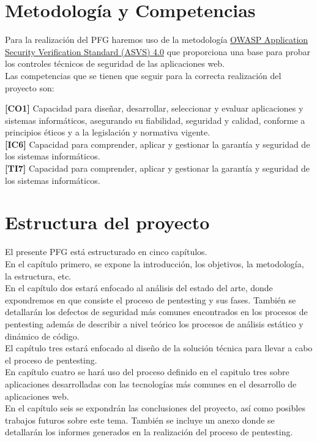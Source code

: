 \section{Metodología y Competencias}

Para la realización del PFG haremos uso de la 
metodología \href{https://owasp.org/www-pdf-archive/OWASP_Application_Security_Verification_Standard_4.0-en.pdf}{OWASP Application Security Verification Standard (ASVS) 4.0} \cite{web2} que 
proporciona una base para probar los controles técnicos de seguridad de las aplicaciones web.\\ 

Las competencias que se tienen que seguir para la correcta realización del proyecto son:

\textbf{[CO1]} Capacidad para diseñar, desarrollar, seleccionar y evaluar aplicaciones y sistemas informáticos, asegurando 
su fiabilidad, seguridad y calidad, conforme a principios éticos y a la legislación y normativa vigente.\\

\textbf{[IC6]} Capacidad para comprender, aplicar y gestionar la garantía y seguridad de los sistemas informáticos.\\

\textbf{[TI7]} Capacidad para comprender, aplicar y gestionar la garantía y seguridad de los sistemas informáticos.\\

\section{Estructura del proyecto}

El presente PFG está estructurado en cinco capítulos.\\

En el capítulo primero, se expone la introducción, los objetivos, la metodología, la estructura, etc.\\

En el capítulo dos estará enfocado al análisis del estado del arte, donde expondremos en que consiste el proceso de pentesting y 
sus fases. También se detallarán los defectos de seguridad más comunes encontrados en los procesos de pentesting 
además de describir a nivel teórico los procesos de análisis estático y dinámico de código.\\

El capítulo tres estará enfocado al diseño de la solución técnica para llevar a cabo el proceso de pentesting.\\ 

En capítulo cuatro se hará uso del proceso definido en el capitulo tres sobre aplicaciones desarrolladas con las tecnologías 
más comunes en el desarrollo de aplicaciones web.\\

En el capítulo seis se expondrán las conclusiones del proyecto, así como posibles trabajos futuros sobre este tema.
También se incluye un anexo donde se detallarán los informes generados en la realización del proceso de pentesting.\\

\newpage